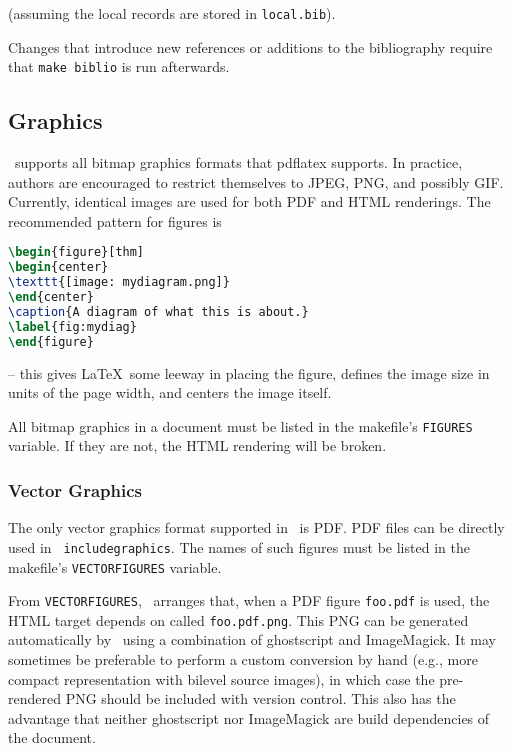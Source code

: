 \documentclass[11pt,a4paper]{ivoa}
\newcommand{\texword}[1]{\texttt{\color{texcolor} #1}}
\begin{document}
\begin{lstlisting}[language=tex]

\end{lstlisting}

(assuming the local records are stored in \texttt{local.bib}).

Changes that introduce new references or additions to the bibliography
require that \texttt{make biblio} is run afterwards.

\subsection{Graphics}

\ivoatex\ supports all bitmap graphics formats that pdflatex supports.
In practice, authors are encouraged to restrict themselves to JPEG, PNG,
and possibly GIF.  Currently, identical images are used for both PDF and
HTML renderings.  The recommended pattern for figures is

\begin{lstlisting}[language=tex]
\begin{figure}[thm]
\begin{center}
\texttt{[image: mydiagram.png]}
\end{center}
\caption{A diagram of what this is about.}
\label{fig:mydiag}
\end{figure}
\end{lstlisting}

-- this gives \LaTeX\ some leeway in placing the figure, defines the image
size in units of the page width, and centers the image itself.

All bitmap graphics in a document must  be listed in the makefile's
\texttt{FIGURES} variable.  If they are not, the HTML rendering will be
broken.

\subsubsection{Vector Graphics}
\label{sect:vectorgraphics}

The only vector graphics format supported in \ivoatex\ is PDF.  PDF
files can be directly used in \texword{includegraphics}.  The names of
such figures must be listed in the makefile's \texttt{VECTORFIGURES}
variable.

From \texttt{VECTORFIGURES}, \ivoatex\ arranges that, when a PDF figure 
\texttt{foo.pdf} is used, the HTML target depends on called
\texttt{foo.pdf.png}.  This PNG can be generated automatically by
\ivoatex\ using a combination of ghostscript and ImageMagick.  It may
sometimes be preferable to perform a custom conversion by hand (e.g.,
more compact representation with bilevel source images), in which case
the pre-rendered PNG should be included with version control.  This also
has the advantage that neither ghostscript nor ImageMagick are build
dependencies of the document.
\end{document}
